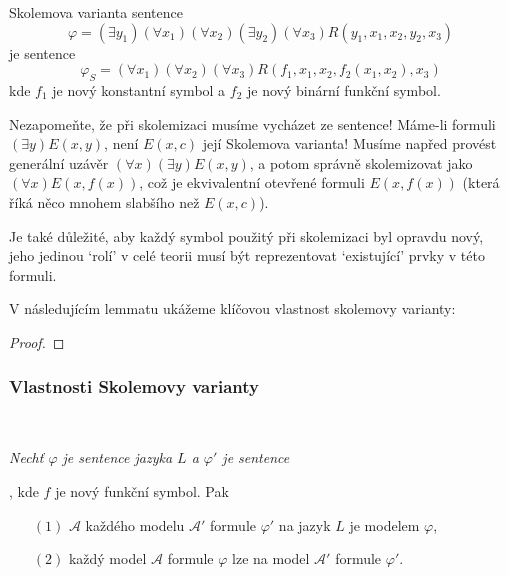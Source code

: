 \begin{example}
    Skolemova varianta sentence 
    $$\varphi=(\exists y_1)(\forall x_1)(\forall x_2)(\exists y_2)(\forall x_3)R(y_1,x_1,x_2,y_2,x_3)$$
    je sentence
    $$
    \varphi_S=(\forall x_1)(\forall x_2)(\forall x_3)R(f_1,x_1,x_2,f_2(x_1,x_2),x_3)
    $$
    kde $f_1$ je nový konstantní symbol a $f_2$ je nový binární funkční symbol.
\end{example}

\begin{remark}
    Nezapomeňte, že při skolemizaci musíme vycházet ze sentence! Máme-li formuli $(\exists y)E(x,y)$, není $E(x,c)$ její Skolemova varianta! Musíme napřed provést generální uzávěr $(\forall x)(\exists y)E(x,y)$, a potom správně skolemizovat jako $(\forall x)E(x,f(x))$, což je ekvivalentní otevřené formuli $E(x,f(x))$ (která říká něco mnohem slabšího než $E(x,c)$).

    Je také důležité, aby každý symbol použitý při skolemizaci byl opravdu nový, jeho jedinou `rolí' v celé teorii musí být reprezentovat `existující' prvky v této formuli.
\end{remark} 

V následujícím lemmatu ukážeme klíčovou vlastnost skolemovy varianty:

\todo

\begin{lemma}
    
\end{lemma}
\begin{proof}
    
\end{proof}

\begin{corollary}
    
\end{corollary}





\subsubsection*{Vlastnosti Skolemovy varianty}

{\bf {}}\ \ {\it Nechť $\varphi$ je sentence  jazyka $L$ a $\varphi'$ je sentence
\smallskip

 , kde $f$ je nový funkční symbol. Pak
\vspace{0.5mm}

\begin{enumerate}
\item[$(1)$]  $\mathcal{A}$ každého modelu $\mathcal{A'}$ formule $\varphi'$ na jazyk $L$ je modelem $\varphi$,
\vspace{0.5mm}

\item[$(2)$] každý model $\mathcal{A}$ formule $\varphi$ lze  na model $\mathcal{A}'$ formule $\varphi'$.
\end{enumerate}}
\smallskip

